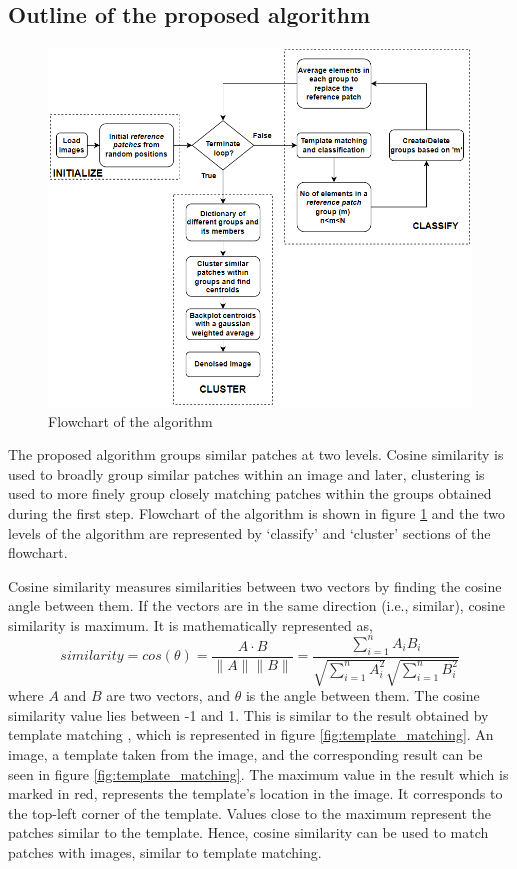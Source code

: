 \documentclass[fleqn,10pt]{wlscirep}
\begin{document}
	\subsection*{Outline of the proposed algorithm}
	
	\begin{figure}
		\centering
		\includegraphics[scale=0.7]{./imgs/flowchart.png}
		\caption{Flowchart of the algorithm}
		\label{fig:flowchart}
	\end{figure} 
	
	The proposed algorithm groups similar patches at two levels. Cosine similarity is used to broadly group similar patches within an image and later, clustering is used to more finely group closely matching patches within the groups obtained during the first step. Flowchart of the algorithm is shown in figure \ref{fig:flowchart} and the two levels of the algorithm are represented by `classify' and `cluster' sections of the flowchart.
	
	Cosine similarity  measures similarities between two vectors\cite{alake_understanding_2021} by finding the cosine angle between them. If the vectors are in the same direction (i.e., similar), cosine similarity is maximum. It is mathematically represented as,
	\begin{equation}
		similarity = cos(\theta) = \frac{A\cdot B}{\|A\|\|B\|} = \frac{\sum_{i=1}^{n}A_i B_i}{\sqrt{\sum_{i=1}^{n}A_i^2}\sqrt{\sum_{i=1}^{n}B_i^2}}
	\end{equation}
	where $A$ and $B$ are two vectors, and $\theta$ is the angle between them. The cosine similarity value lies between -1 and 1. This is similar to the result obtained by template matching , which is represented in figure \ref{fig:template_matching}. An image, a template taken from the image, and the corresponding result can be seen in figure \ref{fig:template_matching}. The maximum value in the result which is marked in red, represents the template’s location in the image. It corresponds to the top-left corner of the template. Values close to the maximum represent the patches similar to the template. Hence, cosine similarity can be used to match patches with images, similar to template matching.
		
\end{document}
